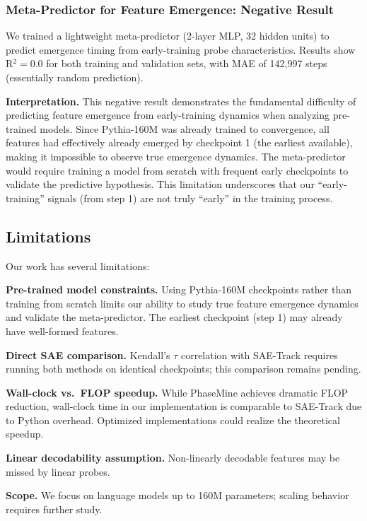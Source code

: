 \documentclass{article}
\begin{document}
\subsubsection{Meta-Predictor for Feature Emergence: Negative Result}

We trained a lightweight meta-predictor (2-layer MLP, 32 hidden units) to predict emergence timing from early-training probe characteristics. Results show R$^2 = 0.0$ for both training and validation sets, with MAE of 142,997 steps (essentially random prediction).

\textbf{Interpretation.} This negative result demonstrates the fundamental difficulty of predicting feature emergence from early-training dynamics when analyzing pre-trained models. Since Pythia-160M was already trained to convergence, all features had effectively already emerged by checkpoint 1 (the earliest available), making it impossible to observe true emergence dynamics. The meta-predictor would require training a model from scratch with frequent early checkpoints to validate the predictive hypothesis. This limitation underscores that our ``early-training'' signals (from step 1) are not truly ``early'' in the training process.

\subsection{Limitations}

Our work has several limitations:

\textbf{Pre-trained model constraints.} Using Pythia-160M checkpoints rather than training from scratch limits our ability to study true feature emergence dynamics and validate the meta-predictor. The earliest checkpoint (step 1) may already have well-formed features.

\textbf{Direct SAE comparison.} Kendall's $\tau$ correlation with SAE-Track requires running both methods on identical checkpoints; this comparison remains pending.

\textbf{Wall-clock vs.~FLOP speedup.} While PhaseMine achieves dramatic FLOP reduction, wall-clock time in our implementation is comparable to SAE-Track due to Python overhead. Optimized implementations could realize the theoretical speedup.

\textbf{Linear decodability assumption.} Non-linearly decodable features may be missed by linear probes.

\textbf{Scope.} We focus on language models up to 160M parameters; scaling behavior requires further study.
\end{document}
